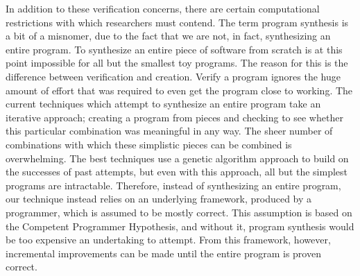 \documentclass[]{article}
\begin{document}
In addition to these verification concerns, there are certain computational
restrictions with which researchers must contend.  The term program
synthesis is a bit of a misnomer, due to the fact that we are not, in fact,
synthesizing an entire program.  To synthesize an entire piece of software
from scratch is at this point impossible for all but the smallest toy
programs.  The reason for this is the difference between verification and
creation.  Verify a program ignores the huge amount of effort that was
required to even get the program close to working.  The current techniques
which attempt to synthesize an entire program take an iterative approach;
creating a program from pieces and checking to see whether this particular
combination was meaningful in any way.  The sheer number of combinations
with which these simplistic pieces can be combined is overwhelming.  The
best techniques use a genetic algorithm approach to build on the successes
of past attempts, but even with this approach, all but the simplest programs
are intractable.  Therefore, instead of synthesizing an entire program, our
technique instead relies on an underlying framework, produced by a
programmer, which is assumed to be mostly correct.  This assumption is based
on the Competent Programmer Hypothesis, and without it, program synthesis
would be too expensive an undertaking to attempt.  From this framework,
however, incremental improvements can be made until the entire program is
proven correct.
\end{document}

